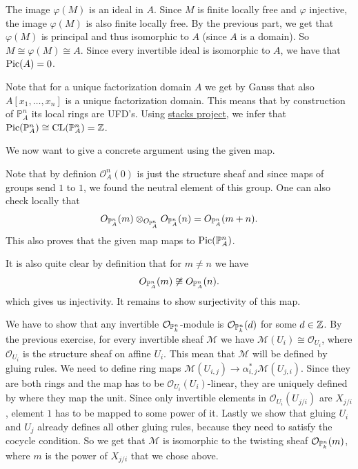 \begin{exercise}{1}
\begin{enumerate}
{                The image $\varphi(M)$ is an ideal in $A$.
                Since $M$ is finite locally free and $\varphi$ injective, the
                image $\varphi(M)$ is also finite locally free. By the previous
                part, we get that $\varphi(M)$ is principal and thus isomorphic to $A$
                (since $A$ is a domain).
                So $M \cong \varphi(M) \cong A$.
                Since every invertible ideal is isomorphic to $A$, we have that
                $\operatorname{Pic}(A) = 0$.
            }
    \end{enumerate}
\end{exercise}

\begin{exercise}{2}
    Note that for a unique factorization domain $A$ we get by Gauss that also
    $A[x_1,\dots, x_n]$ is a unique factorization domain. This means that by
    construction of $\mathbb{P}_A^n$ its local rings are UFD's. Using
    \href{https://stacks.math.columbia.edu/tag/0BE9}{stacks project}, we infer
    that $\operatorname{Pic}(\mathbb{P}_A^n)\cong \operatorname{CL}(\mathbb{P}_A^n)=\mathbb{Z}$.

    We now want to give a concrete argument using the given map.

    Note that by definion $\mathcal{O}^n_A(0)$ is just the structure sheaf and
    since maps of groups send $1$ to $1$, we found the neutral element of this
    group. One can also check locally that 
    \begin{align*}
       O_{\mathbb{P}^n_A}(m)\otimes_{O_{\mathbb{P}^n_A}} O_{\mathbb{P}^n_A}(n) = O_{\mathbb{P}^n_A}(m+n).
    \end{align*}
    This also proves that the given map maps to $\operatorname{Pic}(\mathbb{P}^n_A)$.

    It is also quite clear by definition that for $m\not=n$ we have
    \begin{align}
        O_{\mathbb{P}^n_A}(m)\not \cong O_{\mathbb{P}^n_A}(n).
    \end{align}
    which gives us injectivity.
    It remains to show surjectivity of this map.

    We have to show that any invertible $\mathcal{O}_{\mathbb{P}^n_k}$-module is
    $\mathcal{O}_{\mathbb{P}^n_k}(d)$ for some $d \in \mathbb{Z}$.
    By the previous exercise, for every invertible sheaf $\mathcal{M}$ we have
    $\mathcal{M}(U_i) \cong \mathcal{O}_{U_i}$, where $\mathcal{O}_{U_i}$ is the
    structure sheaf on affine $U_i$.
    This mean that $\mathcal{M}$ will be defined by gluing rules.
    We need to define ring maps $\mathcal{M}(U_{i, j}) \to \alpha^*_{i, j}
    \mathcal{M}(U_{j, i})$. Since they are both rings and the map has to be
    $\mathcal{O}_{U_i}(U_i)$-linear, they are uniquely defined by where they map
    the unit. Since only invertible elements in $\mathcal{O}_{U_i}(U_{j/i})$ are
    $X_{j/i}$, element $1$ has to be mapped to some power of it. 
    Lastly we show that gluing $U_i$ and $U_j$ already defines all other gluing
    rules, because they need to satisfy the cocycle condition. So we get that
    $\mathcal{M}$ is isomorphic to the twisting sheaf
    $\mathcal{O}_{\mathbb{P}^n_k}(m)$, where $m$ is the power of $X_{j/i}$ that we
    chose above.
\end{exercise}

